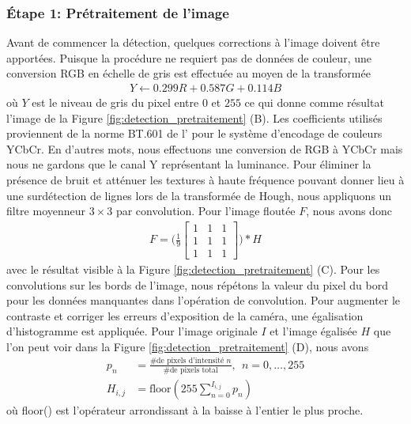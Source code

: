 \subsubsection{Étape 1: Prétraitement de l'image} Avant de commencer la détection, quelques corrections à l'image doivent être apportées. Puisque la procédure ne requiert pas de données de couleur, une conversion RGB en échelle de gris est effectuée au moyen de la transformée
\begin{align}
 Y \leftarrow 0.299 R + 0.587 G + 0.114 B
 \label{eq:rgb2gray}
\end{align}
où $Y$ est le niveau de gris du pixel entre $0$ et $255$ ce qui donne comme résultat l'image de la Figure \ref{fig:detection_pretraitement} (B). Les coefficients utilisés proviennent de la norme BT.601 de l'\cite{BT601Stu24online} pour le système d'encodage de couleurs YCbCr. En d'autres mots, nous effectuons une conversion de RGB à YCbCr mais nous ne gardons que le canal Y représentant la luminance. Pour éliminer la présence de bruit et atténuer les textures à haute fréquence pouvant donner lieu à une surdétection de lignes lors de la transformée de Hough, nous appliquons un filtre moyenneur $3 \times 3$ par convolution. Pour l'image floutée $F$, nous avons donc
\begin{align}
  F = \Bigg(\frac{1}{9}
    \begin{bmatrix}
      1 & 1 & 1\\
      1 & 1 & 1\\
      1 & 1 & 1
    \end{bmatrix}
  \Bigg) * H
  \label{eq:boxfilter}
\end{align}
avec le résultat visible à la Figure \ref{fig:detection_pretraitement} (C). Pour les convolutions sur les bords de l'image, nous répétons la valeur du pixel du bord pour les données manquantes dans l'opération de convolution. Pour augmenter le contraste et corriger les erreurs d'exposition de la caméra, une égalisation d'histogramme est appliquée. Pour l'image originale $I$ et l'image égalisée $H$ que l'on peut voir dans la Figure \ref{fig:detection_pretraitement} (D), nous avons
\begin{align}
  p_n &= \frac{\text{\# de pixels d'intensité } n }{\text{\# de pixels total}}, \ \ n = 0, \ldots, 255 \\
  H_{i,j} &= \text{floor}(255 \sum_{n=0}^{I_{i,j}} p_n)
  \label{eq:egalisation_histogramme}
\end{align}
où floor() est l'opérateur arrondissant à la baisse à l'entier le plus proche.
